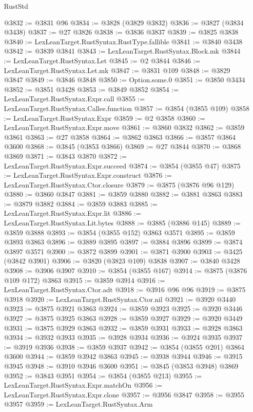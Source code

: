 \begin{lexlean}{RustStd}
\begin{coremodule}
@3832 := @3831 @96
@3834 := @3828 (@3829 @3832)
@3836 := @3827 (@3834 @3438)
@3837 := @27 @3826
@3838 := @3836 @3837
@3839 := @3825 @3838
@3840 := LexLeanTarget.RustSyntax.RustType.fallible
@3841 := @3840 @3438
@3842 := @3839 @3841
@3843 := LexLeanTarget.RustSyntax.Block.mk
@3844 := LexLeanTarget.RustSyntax.Let
@3845 := @2 @3844
@3846 := LexLeanTarget.RustSyntax.Let.mk
@3847 := @3831 @109
@3848 := @3829 @3847
@3849 := @3846 @3848
@3850 := Option.some.{0}
@3851 := @3850 @3434
@3852 := @3851 @3428
@3853 := @3849 @3852
@3854 := LexLeanTarget.RustSyntax.Expr.call
@3855 := LexLeanTarget.RustSyntax.Callee.function
@3857 := @3854 (@3855 @109)
@3858 := LexLeanTarget.RustSyntax.Expr
@3859 := @2 @3858
@3860 := LexLeanTarget.RustSyntax.Expr.move
@3861 := @3860 @3832
@3862 := @3859 @3861
@3863 := @27 @3858
@3864 := @3862 @3863
@3866 := @3857 @3864 @3600
@3868 := @3845 (@3853 @3866)
@3869 := @27 @3844
@3870 := @3868 @3869
@3871 := @3843 @3870
@3872 := LexLeanTarget.RustSyntax.Expr.succeed
@3874 := @3854 (@3855 @47)
@3875 := LexLeanTarget.RustSyntax.Expr.construct
@3876 := LexLeanTarget.RustSyntax.Ctor.closure
@3879 := @3875 (@3876 @96 @129)
@3880 := @3860 @3847
@3881 := @3859 @3880
@3882 := @3881 @3863
@3883 := @3879 @3882
@3884 := @3859 @3883
@3885 := LexLeanTarget.RustSyntax.Expr.lit
@3886 := LexLeanTarget.RustSyntax.Lit.bytes
@3888 := @3885 (@3886 @145)
@3889 := @3859 @3888
@3893 := @3854 (@3855 @152) @3863 @3571
@3895 := @3859 @3893 @3863
@3896 := @3889 @3895
@3897 := @3884 @3896
@3899 := @3874 @3897 @3571
@3900 := @3872 @3899
@3901 := @3871 @3900
@3903 := @3425 (@3842 @3901)
@3906 := @3820 (@3823 @109) @3838
@3907 := @3840 @3428
@3908 := @3906 @3907
@3910 := @3854 (@3855 @167)
@3914 := @3875 (@3876 @109 @172) @3863
@3915 := @3859 @3914
@3916 := LexLeanTarget.RustSyntax.Ctor.adt
@3918 := @3916 @96 @96
@3919 := @3875 @3918
@3920 := LexLeanTarget.RustSyntax.Ctor.nil
@3921 := @3920 @3440
@3923 := @3875 @3921 @3863
@3924 := @3859 @3923
@3925 := @3920 @3446
@3927 := @3875 @3925 @3863
@3928 := @3859 @3927
@3929 := @3920 @3449
@3931 := @3875 @3929 @3863
@3932 := @3859 @3931
@3933 := @3928 @3863
@3934 := @3932 @3933
@3935 := @3928 @3934
@3936 := @3924 @3935
@3937 := @3919 @3936
@3938 := @3859 @3937
@3942 := @3854 (@3855 @201) @3864 @3600
@3944 := @3859 @3942 @3863
@3945 := @3938 @3944
@3946 := @3915 @3945
@3948 := @3910 @3946 @3600
@3951 := @3845 (@3853 @3948) @3869
@3952 := @3843 @3951
@3954 := @3854 (@3855 @213)
@3955 := LexLeanTarget.RustSyntax.Expr.matchOn
@3956 := LexLeanTarget.RustSyntax.Expr.clone
@3957 := @3956 @3847
@3958 := @3955 @3957
@3959 := LexLeanTarget.RustSyntax.Arm

\end{coremodule}
\end{lexlean}
